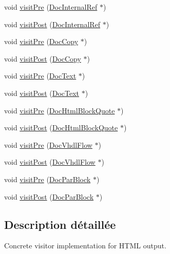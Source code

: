 \begin{DoxyCompactItemize}
\item 
void \hyperlink{class_html_doc_visitor_a850ea96236f17c18c6f65a59759c0879}{visit\+Pre} (\hyperlink{class_doc_internal_ref}{Doc\+Internal\+Ref} $\ast$)
\item 
void \hyperlink{class_html_doc_visitor_a853ccb26887124f48156bc32e195424d}{visit\+Post} (\hyperlink{class_doc_internal_ref}{Doc\+Internal\+Ref} $\ast$)
\item 
void \hyperlink{class_html_doc_visitor_a4fe25e2fa46425be2ec45494366cf50e}{visit\+Pre} (\hyperlink{class_doc_copy}{Doc\+Copy} $\ast$)
\item 
void \hyperlink{class_html_doc_visitor_a7217fafc5e329aa42192db6b93dad247}{visit\+Post} (\hyperlink{class_doc_copy}{Doc\+Copy} $\ast$)
\item 
void \hyperlink{class_html_doc_visitor_aa56d781f4b8718a34a58d40fc14ab62d}{visit\+Pre} (\hyperlink{class_doc_text}{Doc\+Text} $\ast$)
\item 
void \hyperlink{class_html_doc_visitor_a3e83a9e3f3751a402bfcc70661847b32}{visit\+Post} (\hyperlink{class_doc_text}{Doc\+Text} $\ast$)
\item 
void \hyperlink{class_html_doc_visitor_a5ac10770cee0207afbfb627f0fef2819}{visit\+Pre} (\hyperlink{class_doc_html_block_quote}{Doc\+Html\+Block\+Quote} $\ast$)
\item 
void \hyperlink{class_html_doc_visitor_a2f765f1216f148e2c734f3f06f2dd182}{visit\+Post} (\hyperlink{class_doc_html_block_quote}{Doc\+Html\+Block\+Quote} $\ast$)
\item 
void \hyperlink{class_html_doc_visitor_a25e8b31e76f6173589eca996390c2780}{visit\+Pre} (\hyperlink{class_doc_vhdl_flow}{Doc\+Vhdl\+Flow} $\ast$)
\item 
void \hyperlink{class_html_doc_visitor_a32b9aee7289d403c0b05a5d70e5ed0c0}{visit\+Post} (\hyperlink{class_doc_vhdl_flow}{Doc\+Vhdl\+Flow} $\ast$)
\item 
void \hyperlink{class_html_doc_visitor_a9866850efb244be14ded12ebf371fb1c}{visit\+Pre} (\hyperlink{class_doc_par_block}{Doc\+Par\+Block} $\ast$)
\item 
void \hyperlink{class_html_doc_visitor_ac12b6bd24c6686010179403265014a16}{visit\+Post} (\hyperlink{class_doc_par_block}{Doc\+Par\+Block} $\ast$)
\end{DoxyCompactItemize}


\subsection{Description détaillée}
Concrete visitor implementation for H\+T\+M\+L output. 

